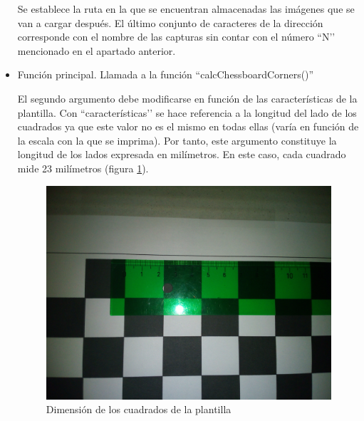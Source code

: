 \begin{itemize}
Se establece la ruta en la que se encuentran almacenadas las imágenes que se van a cargar después. El último conjunto de caracteres de la dirección corresponde con el nombre de las capturas sin contar con el número ``N’’ mencionado en el apartado anterior.

    \item Función principal. Llamada a la función ``calcChessboardCorners()''
    

El segundo argumento debe modificarse en función de las características de la plantilla. Con ``características’’ se hace referencia a la longitud del lado de los cuadrados ya que este valor no es el mismo en todas ellas (varía en función de la escala con la que se imprima). Por tanto, este argumento constituye la longitud de los lados expresada en milímetros. En este caso, cada cuadrado mide 23 milímetros (figura \ref{fig: dimensioncuadrados}).

    \begin{figure}
    \centering
    \includegraphics[scale = 0.05]{capitulo_03/figuras_dir/milimetros.jpg}
    \caption{Dimensión de los cuadrados de la plantilla}
    \label{fig: dimensioncuadrados}
    \end{figure}



\end{itemize}
